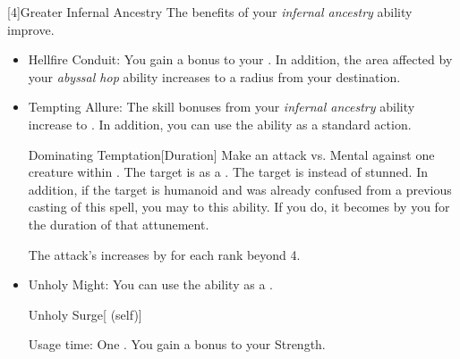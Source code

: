             [4]{Greater Infernal Ancestry} The benefits of your \textit{infernal ancestry} ability improve.
            \begin{itemize}
                \item Hellfire Conduit: You gain a  bonus to your .
                    In addition, the area affected by your \textit{abyssal hop} ability increases to a \smallarea radius from your destination.
                \item Tempting Allure: The skill bonuses from your \textit{infernal ancestry} ability increase to .
                    In addition, you can use the  ability as a standard action.
                    \begin{durationability}{Dominating Temptation}[Duration]
                        \rankline
                        \noindent
                        Make an attack vs. Mental against one creature within \shortrange.%
                        \vspace{0.25em}
                        \hit The target is \stunned as a .
                        \crit The target is \confused instead of stunned.
                        In addition, if the target is humanoid and was already confused from a previous casting of this spell, you may  to this ability.
                        If you do, it becomes \dominated by you for the duration of that attunement.

                        \rankline
                        \noindent The attack's  increases by  for each rank beyond 4.
                        \vspace{0.1em}
                    \end{durationability}
                \item Unholy Might: You can use the  ability as a .
                    \begin{attuneability}{Unholy Surge}[ (self)]
                        \par \noindent Usage time: One .
                        \rankline
                        You gain a  bonus to your Strength.
                    \end{attuneability}
            \end{itemize}

